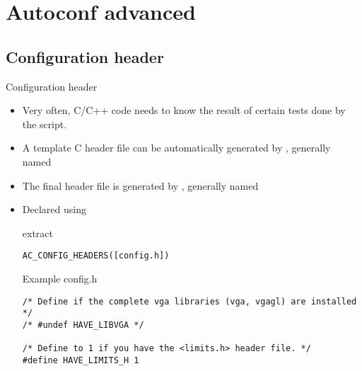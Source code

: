 
\section{Autoconf advanced}

\subsection{Configuration header}

\begin{frame}[fragile]{Configuration header}
  \begin{itemize}
  \item Very often, C/C++ code needs to know the result of certain
    tests done by the  script.
  \item A template C header file can be automatically generated by
    , generally named 
  \item The final header file is generated by ,
    generally named 
  \item Declared using 
    \begin{block}{ extract}
\begin{verbatim}
AC_CONFIG_HEADERS([config.h])
\end{verbatim}
    \end{block}

    \begin{block}{Example config.h}
\begin{verbatim}
/* Define if the complete vga libraries (vga, vgagl) are installed */
/* #undef HAVE_LIBVGA */

/* Define to 1 if you have the <limits.h> header file. */
#define HAVE_LIMITS_H 1
\end{verbatim}
\end{block}
  \end{itemize}
\end{frame}


